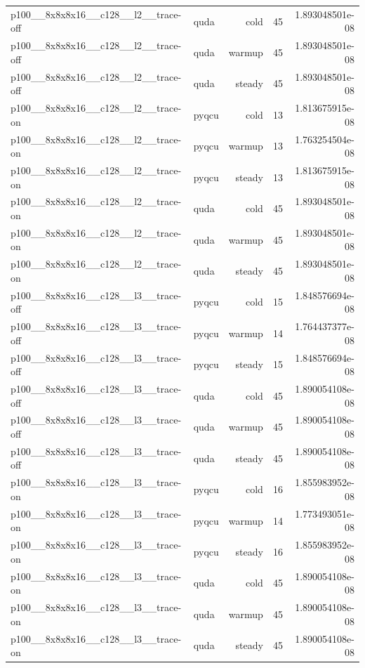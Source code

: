 \begin{table}[htbp]
\begin{tabular}{@{}llrrr@{}}
p100\_\_8x8x8x16\_\_c128\_\_l2\_\_trace-off & quda & cold & 45 & 1.893048501e-08 \\
p100\_\_8x8x8x16\_\_c128\_\_l2\_\_trace-off & quda & warmup & 45 & 1.893048501e-08 \\
p100\_\_8x8x8x16\_\_c128\_\_l2\_\_trace-off & quda & steady & 45 & 1.893048501e-08 \\
p100\_\_8x8x8x16\_\_c128\_\_l2\_\_trace-on & pyqcu & cold & 13 & 1.813675915e-08 \\
p100\_\_8x8x8x16\_\_c128\_\_l2\_\_trace-on & pyqcu & warmup & 13 & 1.763254504e-08 \\
p100\_\_8x8x8x16\_\_c128\_\_l2\_\_trace-on & pyqcu & steady & 13 & 1.813675915e-08 \\
p100\_\_8x8x8x16\_\_c128\_\_l2\_\_trace-on & quda & cold & 45 & 1.893048501e-08 \\
p100\_\_8x8x8x16\_\_c128\_\_l2\_\_trace-on & quda & warmup & 45 & 1.893048501e-08 \\
p100\_\_8x8x8x16\_\_c128\_\_l2\_\_trace-on & quda & steady & 45 & 1.893048501e-08 \\
p100\_\_8x8x8x16\_\_c128\_\_l3\_\_trace-off & pyqcu & cold & 15 & 1.848576694e-08 \\
p100\_\_8x8x8x16\_\_c128\_\_l3\_\_trace-off & pyqcu & warmup & 14 & 1.764437377e-08 \\
p100\_\_8x8x8x16\_\_c128\_\_l3\_\_trace-off & pyqcu & steady & 15 & 1.848576694e-08 \\
p100\_\_8x8x8x16\_\_c128\_\_l3\_\_trace-off & quda & cold & 45 & 1.890054108e-08 \\
p100\_\_8x8x8x16\_\_c128\_\_l3\_\_trace-off & quda & warmup & 45 & 1.890054108e-08 \\
p100\_\_8x8x8x16\_\_c128\_\_l3\_\_trace-off & quda & steady & 45 & 1.890054108e-08 \\
p100\_\_8x8x8x16\_\_c128\_\_l3\_\_trace-on & pyqcu & cold & 16 & 1.855983952e-08 \\
p100\_\_8x8x8x16\_\_c128\_\_l3\_\_trace-on & pyqcu & warmup & 14 & 1.773493051e-08 \\
p100\_\_8x8x8x16\_\_c128\_\_l3\_\_trace-on & pyqcu & steady & 16 & 1.855983952e-08 \\
p100\_\_8x8x8x16\_\_c128\_\_l3\_\_trace-on & quda & cold & 45 & 1.890054108e-08 \\
p100\_\_8x8x8x16\_\_c128\_\_l3\_\_trace-on & quda & warmup & 45 & 1.890054108e-08 \\
p100\_\_8x8x8x16\_\_c128\_\_l3\_\_trace-on & quda & steady & 45 & 1.890054108e-08 \\

\end{tabular}
\end{table}
